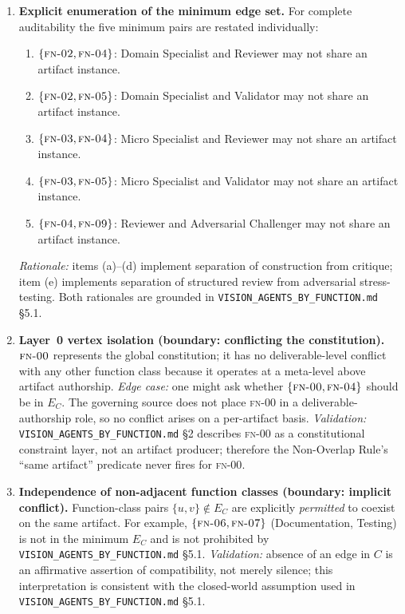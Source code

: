 \documentclass[12pt]{article}
\theoremstyle{definition}
\newcommand{\code}[1]{\texttt{#1}}
\newcommand{\FN}[1]{\textsc{fn-#1}}
\newcommand{\VisionFunc}{\code{VISION\_AGENTS\_\allowbreak BY\_FUNCTION.md}}
\begin{document}
\begin{enumerate}[label=\textbf{C\arabic*.}, leftmargin=*, widest=C9]
  \item \textbf{Explicit enumeration of the minimum edge set.}
        For complete auditability the five minimum pairs are restated
        individually:
        \begin{enumerate}[label=(\alph*), leftmargin=*]
          \item $\{\FN{02}, \FN{04}\}$: Domain Specialist and
                Reviewer may not share an artifact instance.
          \item $\{\FN{02}, \FN{05}\}$: Domain Specialist and
                Validator may not share an artifact instance.
          \item $\{\FN{03}, \FN{04}\}$: Micro Specialist and
                Reviewer may not share an artifact instance.
          \item $\{\FN{03}, \FN{05}\}$: Micro Specialist and
                Validator may not share an artifact instance.
          \item $\{\FN{04}, \FN{09}\}$: Reviewer and Adversarial
                Challenger may not share an artifact instance.
        \end{enumerate}
        \emph{Rationale:} items (a)--(d) implement separation of
        construction from critique; item (e) implements separation
        of structured review from adversarial stress-testing.
        Both rationales are grounded in \VisionFunc{} \S5.1.

  \item \textbf{Layer~0 vertex isolation (boundary: conflicting
        the constitution).}
        $\FN{00}$ represents the global constitution; it has no
        deliverable-level conflict with any other function class
        because it operates at a meta-level above artifact
        authorship.
        \emph{Edge case:} one might ask whether
        $\{\FN{00}, \FN{04}\}$ should be in $E_C$.
        The governing source does not place \FN{00} in a
        deliverable-authorship role, so no conflict arises on
        a per-artifact basis.
        \emph{Validation:} \VisionFunc{} \S2 describes \FN{00} as
        a constitutional constraint layer, not an artifact producer;
        therefore the Non-Overlap Rule's ``same artifact'' predicate
        never fires for \FN{00}.

  \item \textbf{Independence of non-adjacent function classes
        (boundary: implicit conflict).}
        Function-class pairs $\{u,v\} \notin E_C$ are explicitly
        \emph{permitted} to coexist on the same artifact.
        For example, $\{\FN{06}, \FN{07}\}$ (Documentation,
        Testing) is not in the minimum $E_C$ and is not prohibited
        by \VisionFunc{} \S5.1.
        \emph{Validation:} absence of an edge in $C$ is an
        affirmative assertion of compatibility, not merely silence;
        this interpretation is consistent with the closed-world
        assumption used in \VisionFunc{} \S5.1.

\end{enumerate}
\end{document}
